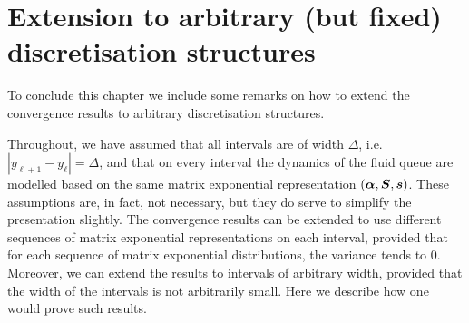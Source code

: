 

\section{Extension to arbitrary (but fixed) discretisation structures}
To conclude this chapter we include some remarks on how to extend the convergence results to arbitrary discretisation structures. 

Throughout, we have assumed that all intervals are of width \(\Delta\), i.e.~\(|y_{\ell+1}-y_\ell|=\Delta\), and that on every interval the dynamics of the fluid queue are modelled based on the same matrix exponential representation \((\boldsymbol \alpha, \boldsymbol S, \boldsymbol s)\). These assumptions are, in fact, not necessary, but they do serve to simplify the presentation slightly. The convergence results can be extended to use different sequences of matrix exponential representations on each interval, provided that for each sequence of matrix exponential distributions, the variance tends to \(0\). Moreover, we can extend the results to intervals of arbitrary width, provided that the width of the intervals is not arbitrarily small. Here we describe how one would prove such results.

